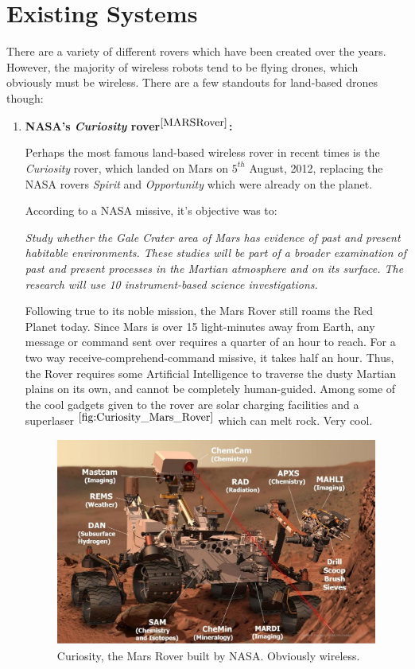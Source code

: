 \section{Existing Systems}

There are a variety of different rovers which have been created over the years. However, the majority of wireless robots tend to be flying drones, which obviously must be wireless. There are a few standouts for land-based drones though:

\begin{enumerate}
	\item \textbf{NASA's \textit{Curiosity} rover${}^{\cite{MARSRover}}$:}
	
		Perhaps the most famous land-based wireless rover in recent times is the \textit{Curiosity} rover, which landed on Mars on $5^{th}$ August, 2012, replacing the NASA rovers \textit{Spirit} and \textit{Opportunity} which were already on the planet. 
		
		According to a NASA missive, it's objective was to:
		
		\begin{displayquote}
			\textit{Study whether the Gale Crater area of Mars has evidence of past and present habitable environments. These studies will be part of a broader examination of past and present processes in the Martian atmosphere and on its surface. The research will use 10 instrument-based science investigations.}
		\end{displayquote}
		
		Following true to its noble mission, the Mars Rover still roams the Red Planet today. Since Mars is over 15 light-minutes away from Earth, any message or command sent over requires a quarter of an hour to reach. For a two way receive-comprehend-command missive, it takes half an hour. Thus, the Rover requires some Artificial Intelligence to traverse the dusty Martian plains on its own, and cannot be completely human-guided. Among some of the cool gadgets given to the rover are solar charging facilities and a superlaser ${}^{\ref{fig:Curiosity_Mars_Rover}}$ which can melt rock. Very cool.
		
		\begin{figure}
			\centering
			\includegraphics[width=0.7\linewidth]{"Curiosity_Mars_Rover.bmp"}
			\caption{Curiosity, the Mars Rover built by NASA. Obviously wireless.}
			\label{fig:Curiosity_Mars_Rover}
		\end{figure}
		

\end{enumerate}
